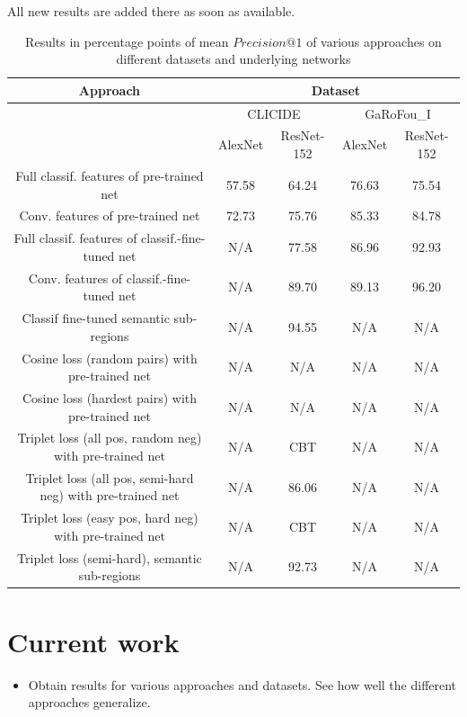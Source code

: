 \documentclass[fleqn]{article}
\begin{document}
All new results are added there as soon as available.

\begin{table}
\begin{tabular}{|c|c|c||c|c|}
\hline
Approach & \multicolumn{4}{|c|}{Dataset}\\
\hline
& \multicolumn{2}{|c||}{CLICIDE} & \multicolumn{2}{|c|}{GaRoFou\_I}\\
\hline
& AlexNet & ResNet-152 & AlexNet & ResNet-152\\
\hline
Full classif. features of pre-trained net
& 57.58 & 64.24 & 76.63 & 75.54 \\
\hline
Conv. features of pre-trained net
& 72.73 & 75.76 & 85.33 & 84.78 \\
\hline
Full classif. features of classif.-fine-tuned net
& N/A & 77.58 & 86.96 & 92.93 \\
\hline
Conv. features of classif.-fine-tuned net
& N/A & 89.70 & 89.13 & 96.20 \\
\hline
Classif fine-tuned semantic sub-regions
& N/A & 94.55 & N/A & N/A \\
\hline
Cosine loss (random pairs) with pre-trained net
& N/A & N/A & N/A & N/A \\
\hline
Cosine loss (hardest pairs) with pre-trained net
& N/A & N/A & N/A & N/A \\
\hline
Triplet loss (all pos, random neg) with pre-trained net
& N/A & CBT & N/A & N/A \\
\hline
Triplet loss (all pos, semi-hard neg) with pre-trained net
& N/A & 86.06 & N/A & N/A \\
\hline
Triplet loss (easy pos, hard neg) with pre-trained net
& N/A & CBT & N/A & N/A \\
\hline
Triplet loss (semi-hard), semantic sub-regions
& N/A & 92.73 & N/A & N/A \\
\hline
\end{tabular}
\caption{Results in percentage points of mean $Precision@1$ of various approaches on different datasets and underlying networks\label{tab:results}}
\end{table}

\section{Current work}
\begin{itemize}
    \item Obtain results for various approaches and datasets. See how well
    the different approaches generalize.
\end{itemize}
\end{document}
